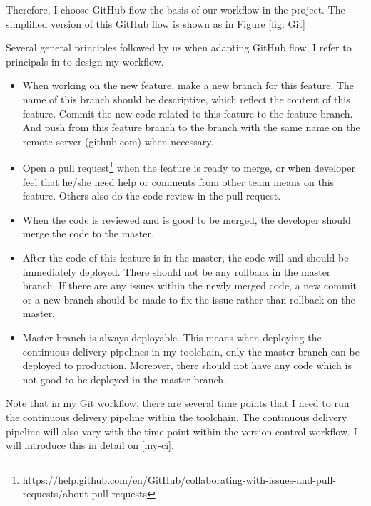 Therefore, I choose GitHub flow \cite{chacongithub} the basis of our workflow in the project. The simplified version of this GitHub flow is shown as in Figure \ref{fig: Git} 
\par
Several general principles followed by us when adapting GitHub flow, I refer to principals in \cite{chacongithub} to design my workflow.
\begin{itemize}
\item When working on the new feature, make a new branch for this feature. The name of this branch should be descriptive, which reflect the content of this feature. Commit the new code related to this feature to the feature branch. And push from this feature branch to the branch with the same name on the remote server (github.com) when necessary.
\item Open a pull request\footnote{https://help.github.com/en/GitHub/collaborating-with-issues-and-pull-requests/about-pull-requests} when the feature is ready to merge, or when developer feel that he/she need help or comments from other team means on this feature. Others also do the code review in the pull request.
\item When the code is reviewed and is good to be merged, the developer should merge the code to the master.
\item After the code of this feature is in the master, the code will and should be immediately deployed. There should not be any rollback in the master branch. If there are any issues within the newly merged code, a new commit or a new branch should be made to fix the issue rather than rollback on the master.
\item Master branch is always deployable. This means when deploying the continuous delivery pipelines in my toolchain, only the master branch can be deployed to production. Moreover, there should not have any code which is not good to be deployed in the master branch.
\end{itemize}
\par
Note that in my Git workflow, there are several time points that I need to run the continuous delivery pipeline within the toolchain. The continuous delivery pipeline will also vary with the time point within the version control workflow. I will introduce this in detail on \ref{my-ci}.
